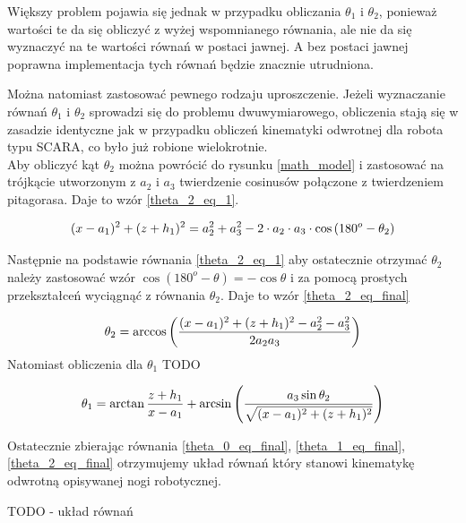 Większy problem pojawia się jednak w przypadku obliczania $\theta_1$ i $\theta_2$, ponieważ wartości te da się obliczyć z wyżej wspomnianego równania, ale nie da się wyznaczyć na te wartości równań w postaci jawnej. A bez postaci jawnej poprawna implementacja tych równań będzie znacznie utrudniona.

Można natomiast zastosować pewnego rodzaju uproszczenie. Jeżeli wyznaczanie równań $\theta_1$ i $\theta_2$ sprowadzi się do problemu dwuwymiarowego, obliczenia stają się w zasadzie identyczne jak w przypadku obliczeń kinematyki odwrotnej dla robota typu SCARA, co było już robione wielokrotnie.\\

Aby obliczyć kąt $\theta_2$ można powrócić do rysunku \ref{math_model} i zastosować na trójkącie utworzonym z $a_2$ i $a_3$ twierdzenie cosinusów połączone z twierdzeniem pitagorasa. Daje to wzór \ref{theta_2_eq_1}.

\begin{equation} \label{theta_2_eq_1}
(x - a_1)^2 + (z + h_1)^2 = a_2^2 + a_3^2 - 2 \cdot a_2 \cdot a_3 \cdot \cos{(180^o - \theta_2)}\\
\end{equation}

Następnie na podstawie równania \ref{theta_2_eq_1} aby ostatecznie otrzymać $\theta_2$ należy zastosować wzór $\cos{(180^o - \theta)} = -\cos{\theta}$ i za pomocą prostych przekształceń wyciągnąć z równania $\theta_2$. Daje to wzór \ref{theta_2_eq_final}

\begin{equation} \label{theta_2_eq_final}
\theta_2 = \arccos{\left( \frac{(x - a_1)^2 + (z + h_1)^2 - a_2^2 - a_3^2}{2 a_2 a_3} \right)}\\ 
\end{equation} \cite{SCARA_model}
Natomiast obliczenia dla $\theta_1$ TODO

\begin{equation}\label{theta_1_eq_final}
\theta_1 = \arctan{\frac{z + h_1}{x - a_1}} + \arcsin{\left( \frac{a_3 \sin{\theta_2} }{ \sqrt{ (x - a_1)^2 + (z + h_1)^2}} \right)}\\ 
\end{equation}\cite{SCARA_model}

Ostatecznie zbierając równania \ref{theta_0_eq_final}, \ref{theta_1_eq_final}, \ref{theta_2_eq_final} otrzymujemy układ równań który stanowi kinematykę odwrotną opisywanej nogi robotycznej.

TODO - układ równań

